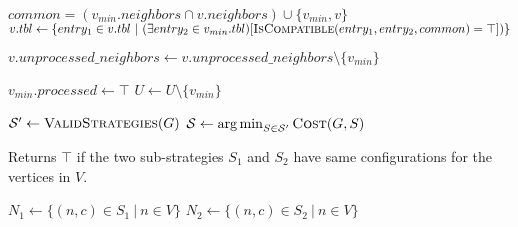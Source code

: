 \documentclass{article}
\newcommand{\strategy}{\ensuremath{\mathcal{S}}}
\DeclareMathOperator*{\argmin}{arg\,min}
\newcommand{\set}[1]{\{#1\}}
\begin{document}
\begin{algorithm}
\begin{algorithmic}[1]
			\State $common = (v_{min}.neighbors \cap v.neighbors) \cup
			\set{v_{min}, v}$
			\State $v.tbl \leftarrow \set{entry_1\in v.tbl ~|~ (\exists
			entry_2 \in v_{min}.tbl)[\Call{IsCompatible}{entry_1, entry_2, common) =
			\top]}}$

			\Statex

			\State $v.unprocessed\_neighbors \leftarrow
			v.unprocessed\_neighbors\setminus \set{v_{min}}$
		\EndFor

		\Statex
		\State $v_{min}.processed \leftarrow \top$
		\State $U \leftarrow U\setminus \set{v_{min}}$
	\EndWhile
	\Statex

	\State $\strategy' \leftarrow \Call{ValidStrategies}{G}$ 
	\State $\strategy \leftarrow \argmin_{S\in \strategy'} \Call{Cost}{G, S}$
	\State \Return{\strategy}

	\EndProcedure
\end{algorithmic}

\end{algorithm}

\begin{algorithm}
	\caption{\label{alg:is-compatible}Returns $\top$ if the two
	sub-strategies $S_1$ and $S_2$ have same configurations for the
	vertices in $V$.}

	\begin{algorithmic}[1]
			\State $N_1 \leftarrow \set{(n,c)\in S_1~|~n \in V}$
			\State $N_2 \leftarrow \set{(n,c)\in S_2~|~n \in V}$
			\Statex

				\State \Return{$\bot$}
			\EndIf
			\Statex
			\State \Return{$\top$}
		\EndProcedure
	\end{algorithmic}
\end{algorithm}
\end{document}
